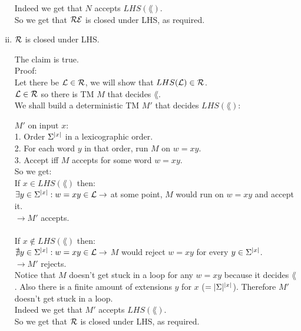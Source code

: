 \begin{enumerate}[i.]
            Indeed we get that $N$ accepts $LHS(\lang)$. \\
            So we get that $\mathcal{R}\mathcal{E}$ is closed under LHS, as required. \\

      \item $\mathcal{R}$ is closed under LHS.

            The claim is true. \\

            Proof: \\
            Let there be $\mathcal{L} \in \mathcal{R}$, we will show that $LHS(\mathcal{L}) \in \mathcal{R}$. \\
            $\mathcal{L} \in \mathcal{R}$ so there is TM $M$ that decides $\lang$. \\
            We shall build a deterministic TM $M'$ that decides $LHS(\lang)$:

            $M' \text{ on input } x$: \\
            1. Order $\Sigma^{|x|}$ in a lexicographic order. \\
            2. For each word $y$ in that order, run $M$ on $w=xy$. \\
            3. Accept iff $M$ accepts for some word $w=xy$. \\

            So we get: \\
            If $x \in LHS(\lang)$ then: \\
            $\exists y \in \Sigma^{|x|}: w=xy \in \mathcal{L} \rightarrow $ at some point, $M$ would run on $w=xy$ and accept it. \\
            $\rightarrow M'$ accepts. \\ \\

            If $x \notin LHS(\lang)$ then: \\
            $\nexists y \in \Sigma^{|x|}: w=xy \in \mathcal{L} \rightarrow $ $M$ would reject $w=xy$ for every $y \in \Sigma^{|x|}$. \\
            $\rightarrow M'$ rejects. \\

            Notice that $M$ doesn't get stuck in a loop for any $w=xy$ because it decides $\lang$.
            Also there is a finite amount of extensions $y$ for $x$ ($=|\Sigma|^{|x|}$).
            Therefore $M'$ doesn't get stuck in a loop. \\

            Indeed we get that $M'$ accepts $LHS(\lang)$. \\
            So we get that $\mathcal{R}$ is closed under LHS, as required. \\

\end{enumerate}